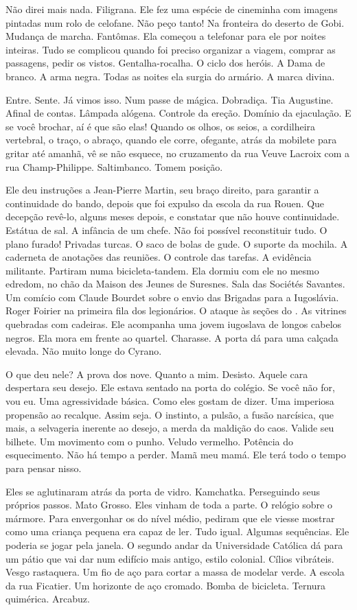 Não direi mais nada. Filigrana. Ele fez uma espécie de cineminha com
imagens pintadas num rolo de celofane. Não peço tanto! Na fronteira do
deserto de Gobi. Mudança de marcha. Fantômas. Ela começou a telefonar
para ele por noites inteiras. Tudo se complicou quando foi preciso
organizar a viagem, comprar as passagens, pedir os vistos.
Gentalha-rocalha. O ciclo dos heróis. A Dama de branco. A arma negra.
Todas as noites ela surgia do armário. A marca divina.

Entre. Sente. Já vimos isso. Num passe de mágica. Dobradiça. Tia
Augustine. Afinal de contas. Lâmpada alógena. Controle da ereção.
Domínio da ejaculação. E se você brochar, aí é que são elas! Quando os
olhos, os seios, a cordilheira vertebral, o traço, o abraço, quando ele
corre, ofegante, atrás da mobilete para gritar até amanhã, vê se não
esquece, no cruzamento da rua Veuve Lacroix com a rua Champ-Philippe.
Saltimbanco. Tomem posição.

Ele deu instruções a Jean-Pierre Martin, seu braço direito, para
garantir a continuidade do bando, depois que foi expulso da escola da
rua Rouen. Que decepção revê-lo, alguns meses depois, e constatar que
não houve continuidade. Estátua de sal. A infância de um chefe. Não foi
possível reconstituir tudo. O plano furado! Privadas turcas. O saco de
bolas de gude. O suporte da mochila. A caderneta de anotações das
reuniões. O controle das tarefas. A evidência militante. Partiram numa
bicicleta-tandem. Ela dormiu com ele no mesmo edredom, no chão da Maison
des Jeunes de Suresnes. Sala das Sociétés Savantes. Um comício com
Claude Bourdet sobre o envio das Brigadas para a Iugoslávia. Roger
Foirier na primeira fila dos legionários. O ataque às seções do . As
vitrines quebradas com cadeiras. Ele acompanha uma jovem iugoslava de
longos cabelos negros. Ela mora em frente ao quartel. Charasse. A porta
dá para uma calçada elevada. Não muito longe do Cyrano.

O que deu nele? A prova dos nove. Quanto a mim. Desisto. Aquele cara
despertara seu desejo. Ele estava sentado na porta do colégio. Se você
não for, vou eu. Uma agressividade básica. Como eles gostam de dizer.
Uma imperiosa propensão ao recalque. Assim seja. O instinto, a pulsão, a
fusão narcísica, que mais, a selvageria inerente ao desejo, a merda da
maldição do caos. Valide seu bilhete. Um movimento com o punho. Veludo
vermelho. Potência do esquecimento. Não há tempo a perder. Mamã meu
mamá. Ele terá todo o tempo para pensar nisso.

Eles se aglutinaram atrás da porta de vidro. Kamchatka. Perseguindo seus
próprios passos. Mato Grosso. Eles vinham de toda a parte. O relógio
sobre o mármore. Para envergonhar os do nível médio, pediram que ele
viesse mostrar como uma criança pequena era capaz de ler. Tudo igual.
Algumas sequências. Ele poderia se jogar pela janela. O segundo andar da
Universidade Católica dá para um pátio que vai dar num edifício mais
antigo, estilo colonial. Cílios vibráteis. Vesgo rastaquera. Um fio de
aço para cortar a massa de modelar verde. A escola da rua Ficatier. Um
horizonte de aço cromado. Bomba de bicicleta. Ternura quimérica.
Arcabuz.


